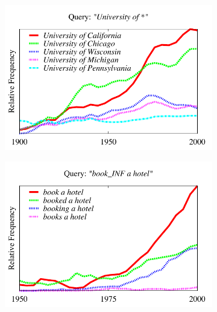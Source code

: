 \documentclass[11pt,a4paper]{article}
\begin{document}
\begin{figure}[!t]
\vspace{-0.5em}
\begin{subfigure}
  \centering
\includegraphics[width=\columnwidth]{graphs/university}\\
\end{subfigure}%
\vspace{-1em}
\begin{subfigure}
\centering
\includegraphics[width=\columnwidth]{graphs/book}\\
\end{subfigure}%
\vspace{-1em}
\begin{subfigure}
\centering

\end{subfigure}
\end{figure}
\end{document}
